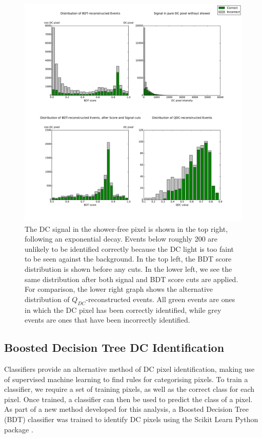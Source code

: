 \documentclass[11pt]{article}
\begin{document}
\begin{figure}
\begin{center}
\includegraphics[width=\textwidth]{hess1statsbigtestdata}
\caption{The DC signal in the shower-free pixel is shown in the top right, following an exponential decay. Events below roughly 200 are unlikely to be identified correctly because the DC light is too faint to be seen against the background. In the top left, the BDT score distribution is shown before any cuts. In the lower left, we see the same distribution after both signal and BDT score cuts are applied. For comparison, the lower right graph shows the alternative distribution of $Q_{DC}$-reconstructed events. All green events are ones in which the DC pixel has been correctly identified, while grey events are ones that have been incorrectly identified.}
\label{fig:cutdistribution}
\end{center}
\end{figure}

\subsection{Boosted Decision Tree DC Identification}
Classifiers provide an alternative method of DC pixel identification, making use of supervised machine learning to find rules for categorising pixels. To train a classifier, we require a set of training pixels, as well as the correct class for each pixel. Once trained, a classifier can then be used to predict the class of a pixel. As part of a new method developed for this analysis, a Boosted Decision Tree (BDT) classifier was trained to identify DC pixels using the Scikit Learn Python package \cite{scikit-learn}.
\end{document}
